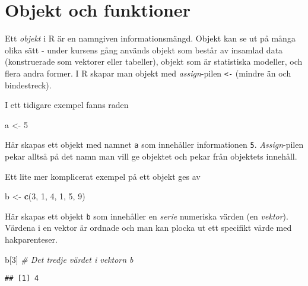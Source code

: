 \documentclass[
]{book}
\newenvironment{Shaded}{\begin{snugshade}}{\end{snugshade}}
\newcommand{\CommentTok}[1]{\textcolor[rgb]{0.56,0.35,0.01}{\textit{#1}}}
\newcommand{\DecValTok}[1]{\textcolor[rgb]{0.00,0.00,0.81}{#1}}
\newcommand{\FunctionTok}[1]{\textcolor[rgb]{0.13,0.29,0.53}{\textbf{#1}}}
\newcommand{\NormalTok}[1]{#1}
\newcommand{\OtherTok}[1]{\textcolor[rgb]{0.56,0.35,0.01}{#1}}
\theoremstyle{definition}
\theoremstyle{definition}
\theoremstyle{definition}
\theoremstyle{definition}
\theoremstyle{remark}
\begin{document}
\hypertarget{objekt-och-funktioner}{%
\section{Objekt och funktioner}\label{objekt-och-funktioner}}

Ett \emph{objekt} i R är en namngiven informationsmängd. Objekt kan se ut på många olika sätt - under kursens gång används objekt som består av insamlad data (konstruerade som vektorer eller tabeller), objekt som är statistiska modeller, och flera andra former. I R skapar man objekt med \emph{assign}-pilen \texttt{\textless{}-} (mindre än och bindestreck).

I ett tidigare exempel fanns raden

\begin{Shaded}
\begin{Highlighting}[]
\NormalTok{a }\OtherTok{\textless{}{-}} \DecValTok{5}
\end{Highlighting}
\end{Shaded}

Här skapas ett objekt med namnet \texttt{a} som innehåller informationen \texttt{5}. \emph{Assign}-pilen pekar alltså på det namn man vill ge objektet och pekar från objektets innehåll.

Ett lite mer komplicerat exempel på ett objekt ges av

\begin{Shaded}
\begin{Highlighting}[]
\NormalTok{b }\OtherTok{\textless{}{-}} \FunctionTok{c}\NormalTok{(}\DecValTok{3}\NormalTok{, }\DecValTok{1}\NormalTok{, }\DecValTok{4}\NormalTok{, }\DecValTok{1}\NormalTok{, }\DecValTok{5}\NormalTok{, }\DecValTok{9}\NormalTok{)}
\end{Highlighting}
\end{Shaded}

Här skapas ett objekt \texttt{b} som innehåller en \emph{serie} numeriska värden (en \emph{vektor}). Värdena i en vektor är ordnade och man kan plocka ut ett specifikt värde med hakparenteser.

\begin{Shaded}
\begin{Highlighting}[]
\NormalTok{b[}\DecValTok{3}\NormalTok{]               }\CommentTok{\# Det tredje värdet i vektorn b}
\end{Highlighting}
\end{Shaded}

\begin{verbatim}
## [1] 4
\end{verbatim}
\end{document}
